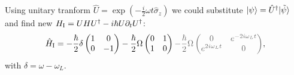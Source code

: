 Using unitary tranform $\hat{U} = \exp\left(
	- \frac{i}{2} \omega t \hat{\sigma}_z
\right)$ we could substitute $\left| \psi \right\rangle = \hat{U}^{\dag} |\tilde{\psi}\rangle$ and find new $H_{\textnormal{I}} = U H U^{\dag} - i \hbar U \partial_t U^{\dag}$:
\begin{equation*}
	\sub{\hat{H}}{I} = - \frac{\hbar}{2} \delta \begin{pmatrix}
	    1 & 0 \\
	    0 & -1 \\
	\end{pmatrix}
	 - \frac{\hbar}{2} \Omega \begin{pmatrix}
	     0 & 1 \\
	     1 & 0 \\
	 \end{pmatrix}
	 \grey{- \frac{\hbar}{2} \Omega \begin{pmatrix}
	     0 & e^{-2 i \omega_L t} \\
	     e^{2 i \omega_L t} & 0 \\
	 \end{pmatrix} },
\end{equation*}
with $\delta = \omega - \omega_L$.